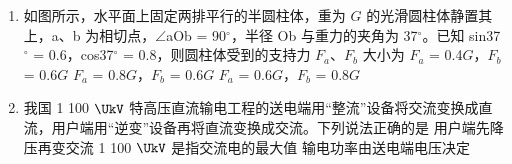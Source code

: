 \documentclass[\gkver]{gaokaozhenti}
\begin{document}
\begin{enumerate}
{即衰变方程中的 X = 234，故 A 错误；

B． 是 $\alpha$ 粒子，穿透能力比 $\gamma$ 射线弱，故 B 错误；

C．比结合能越大越稳定，由于  衰变成为了 ，故  比  稳定，即  比  的比结合能小，故 C 正确；

D．半衰期由原子核本身决定的，与温度等外部因素无关，故 D 错误。

故选 C。
}

\item
如图所示，水平面上固定两排平行的半圆柱体，重为 $G$ 的光滑圆柱体静置其上，a、b 为相切点，$\angle$aOb = 90${^\circ}$，半径 Ob 与重力的夹角为 37${^\circ}$。已知 sin37${^\circ}$ = 0.6，cos37${^\circ}$ = 0.8，则圆柱体受到的支持力 $F_{a}$、$F_{b}$ 大小为
{$F_{a}$ = 0.4$G$，$F_{b}$ = 0.6$G$}
{$F_{a}$ = 0.8$G$，$F_{b}$ = 0.6$G$}
{$F_{a}$ = 0.6$G$，$F_{b}$ = 0.8$G$}

\item
我国 1 100 $\UkV$ 特高压直流输电工程的送电端用“整流”设备将交流变换成直流，用户端用“逆变”设备再将直流变换成交流。下列说法正确的是
{用户端先降压再变交流}
{1 100 $\UkV$ 是指交流电的最大值}
{输电功率由送电端电压决定}


\end{enumerate}
\end{document}
